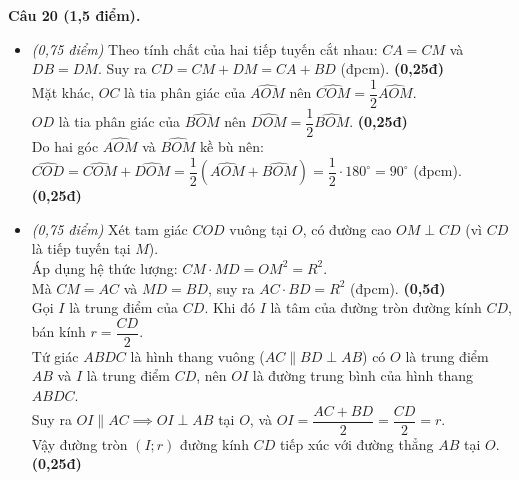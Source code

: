 \documentclass[11pt,a4paper]{article}
\begin{document}
\vspace{2mm}
\noindent
\textbf{Câu 20 (1,5 điểm).}
\begin{itemize}
  \item[a)] \textit{(0,75 điểm)}
  Theo tính chất của hai tiếp tuyến cắt nhau:
  $CA = CM$ và $DB = DM$. Suy ra $CD = CM + DM = CA + BD$ (đpcm). \dotfill \textbf{(0,25đ)}\\
  Mặt khác, $OC$ là tia phân giác của $\widehat{AOM}$ nên $\widehat{COM} = \dfrac{1}{2}\widehat{AOM}$.\\
  $OD$ là tia phân giác của $\widehat{BOM}$ nên $\widehat{DOM} = \dfrac{1}{2}\widehat{BOM}$. \dotfill \textbf{(0,25đ)}\\
  Do hai góc $\widehat{AOM}$ và $\widehat{BOM}$ kề bù nên:
  $\widehat{COD} = \widehat{COM} + \widehat{DOM} = \dfrac{1}{2}(\widehat{AOM} + \widehat{BOM}) = \dfrac{1}{2} \cdot 180^\circ = 90^\circ$ (đpcm). \dotfill \textbf{(0,25đ)}

  \item[b)] \textit{(0,75 điểm)}
  Xét tam giác $COD$ vuông tại $O$, có đường cao $OM \perp CD$ (vì $CD$ là tiếp tuyến tại $M$).\\
  Áp dụng hệ thức lượng: $CM \cdot MD = OM^2 = R^2$.\\
  Mà $CM = AC$ và $MD = BD$, suy ra $AC \cdot BD = R^2$ (đpcm). \dotfill \textbf{(0,5đ)}\\
  Gọi $I$ là trung điểm của $CD$. Khi đó $I$ là tâm của đường tròn đường kính $CD$, bán kính $r = \dfrac{CD}{2}$.\\
  Tứ giác $ABDC$ là hình thang vuông ($AC \parallel BD \perp AB$) có $O$ là trung điểm $AB$ và $I$ là trung điểm $CD$, nên $OI$ là đường trung bình của hình thang $ABDC$.\\
  Suy ra $OI \parallel AC \implies OI \perp AB$ tại $O$, và $OI = \dfrac{AC + BD}{2} = \dfrac{CD}{2} = r$.\\
  Vậy đường tròn $(I; r)$ đường kính $CD$ tiếp xúc với đường thẳng $AB$ tại $O$. \dotfill \textbf{(0,25đ)}
\end{itemize}
\end{document}
